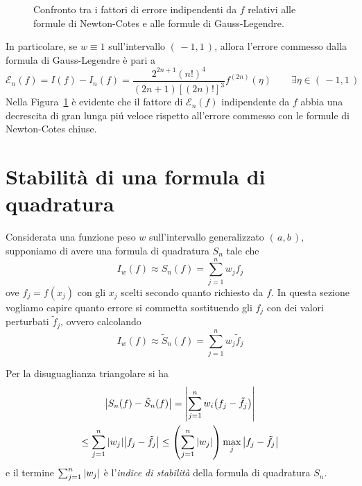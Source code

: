 	\begin{figure}[tpb]
		\centering
		
		
		\caption{Confronto tra i fattori di errore indipendenti da \(f\) relativi alle formule di Newton-Cotes e alle formule di Gauss-Legendre.}\label{fig:legendre-newton}
	\end{figure}

	In particolare, se \(w \equiv 1\) sull'intervallo \((\, -1, 1 \,)\), allora l'errore commesso dalla formula di Gauss-Legendre è pari a
	\begin{equation*}
		\mathcal{E}_n (f) = I (f) - I_n (f) = \frac{2^{2 n + 1} (n!)^4}{(2 n + 1) [(2 n)!]^3} f^{(2 n)} (\eta) \qquad \exists \eta \in (\, -1, 1 \,)
	\end{equation*}
	Nella Figura~\ref{fig:legendre-newton} è evidente che il fattore di \(\mathcal{E}_n (f)\) indipendente da \(f\) abbia una decrescita di gran lunga piú veloce rispetto all'errore commesso con le formule di Newton-Cotes chiuse.

\section[Stabilità delle formule]{Stabilità di una formula di quadratura}
	
	\noindent Considerata una funzione peso \(w\) sull'intervallo generalizzato \((\, a, b \,)\), supponiamo di avere una formula di quadratura \(S_n\) tale che
	\begin{equation*}
		I_w (f) \approx S_n (f) = \sum_{j = 1}^n w_j f_j
	\end{equation*}
	ove \(f_j = f (x_j)\) con gli \(x_j\) scelti secondo quanto richiesto da \(f\). In questa sezione vogliamo capire quanto errore si commetta sostituendo gli \(f_j\) con dei valori perturbati \(\tilde{f}_j\), ovvero calcolando
	\begin{equation*}
		I_w (f) \approx \tilde{S}_n (f) = \sum_{j = 1}^n w_j \tilde{f}_j
	\end{equation*}

	Per la disuguaglianza triangolare si ha
	\begin{multline*}
		\abs{S_n (f) - \tilde{S}_n (f)} = \abs{\sum_{j = 1}^n w_i \qty(f_j - \tilde{f}_j)} \\
		\le \sum_{j = 1}^n \abs{w_j} \abs{f_j - \tilde{f}_j} \le \qty(\sum_{j = 1}^n \abs{w_j}) \max_j \abs{f_j - \tilde{f}_j}
	\end{multline*}
	e il termine \(\sum_{j = 1}^n \abs{w_j}\) è l'\emph{indice di stabilità} della formula di quadratura \(S_n\).
	
